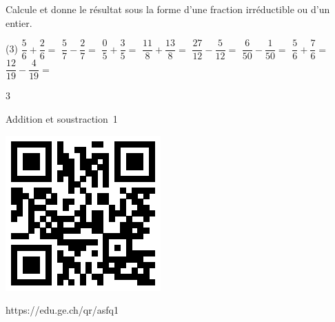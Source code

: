 \documentclass[a4paper,11pt]{report}
\begin{document}
\begin{exo}
{Calcule et donne le résultat sous la forme d'une fraction irréductible ou d'un entier. 
	\begin{tasks}[after-skip=-1em](3)
\task $\dfrac{5}{6}+\dfrac{2}{6}= $ 
 \task $\dfrac{5}{7}-\dfrac{2}{7}=$ 
 \task $\dfrac{0}{5}+\dfrac{3}{5}=$
 \task $\dfrac{11}{8}+\dfrac{13}{8}=$
 \task $\dfrac{27}{12}-\dfrac{5}{12}=$
 \task $\dfrac{6}{50}-\dfrac{1}{50}=$
 \task $\dfrac{5}{6}+\dfrac{7}{6}=$
 \task $\dfrac{12}{19}-\dfrac{4}{19}=$\\ 
\end{tasks}
}{3}
\end{exo}

\begin{qmun}{Addition et soustraction~1}{
		\begin{center}
\includegraphics[scale=1]{media/qr/asfq1}

\tiny{{https://edu.ge.ch/qr/asfq1}}
		\end{center}
	}
\end{qmun}
\end{document}
